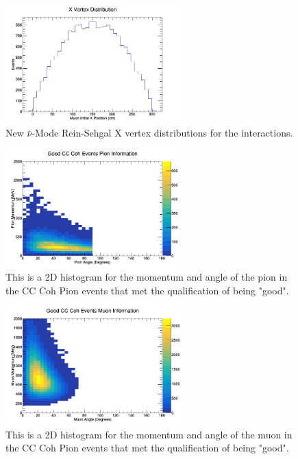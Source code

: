 \documentclass[11pt]{article}
\begin{document}
\begin{figure}[H]
\centering
\includegraphics[width=0.6\textwidth]{NewANMReinSehgalImages/4-XVertexDistributionANMRS.png}
\caption{New $\bar{\nu}$-Mode Rein-Sehgal X vertex distributions for the interactions.}
\end{figure}

\begin{figure}[H]
\centering
\includegraphics[width=0.6\textwidth]{NewANMReinSehgalImages/5-GoodCCCohPionInfoANMRS.png}
\caption{This is a 2D histogram for the momentum and angle of the pion in the CC Coh Pion events that met the qualification of being "good".}
\end{figure}

\begin{figure}[H]
\centering
\includegraphics[width=0.6\textwidth]{NewANMReinSehgalImages/6-GoodCCCohMuonInfoANMRS.png}
\caption{This is a 2D histogram for the momentum and angle of the muon in the CC Coh Pion events that met the qualification of being "good".}
\end{figure}
\end{document}
